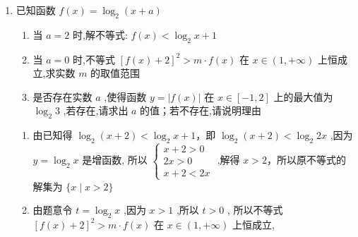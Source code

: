 \begin{enumerate}
\begin{jieda}
        又 $\forall {x}_{1} \in  \left\lbrack  {0,1}\right\rbrack  ,\exists {x}_{2} \in  \left\lbrack  {-3,5}\right\rbrack$ ,使得 $g\left( {x}_{1}\right)  = f\left( {x}_{2}\right)$ ,
        
        所以 $\left\lbrack  {{2m} + 2,m + 2}\right\rbrack   \subseteq  \left\lbrack  {1,3}\right\rbrack$ ,
        
        所以 $\left\{  \begin{array}{l} {2m} + 2 \geq  1 \\  m + 2 \leq  3 \end{array}\right.$ ,解得 $- \dfrac{1}{2} \leq  m < 0$ .
        
        综上,实数 $m$ 的取值范围是 $\left\lbrack  {-\dfrac{1}{2},0}\right)  \cup  \left( {0,\dfrac{1}{2}}\right\rbrack$ .
    \end{jieda}
    \item 已知函数 $f\left( x\right)  = {\log }_{2}\left( {x + a}\right)$
    \begin{enumerate}
        \item 当 $a = 2$ 时,解不等式: $f\left( x\right)  < {\log }_{2}x + 1$
        \item 当 $a = 0$ 时,不等式 ${\left\lbrack  f\left( x\right)  + 2\right\rbrack  }^{2} > m \cdot  f\left( x\right)$ 在 $x \in  \left( {1, + \infty }\right)$ 上恒成立,求实数 $m$ 的取值范围
        \item 是否存在实数 $a$ ,使得函数 $y = \left| {f\left( x\right) }\right|$ 在 $x \in  \left\lbrack  {-1,2}\right\rbrack$ 上的最大值为 ${\log }_{2}3$ ,若存在,请求出 $a$ 的值；若不存在,请说明理由
    \end{enumerate}
    \begin{jieda}
        \begin{enumerate}
            \item 由已知得 ${\log }_{2}\left( {x + 2}\right)  < {\log }_{2}x + 1$，即 ${\log }_{2}\left( {x + 2}\right)  < {\log }_{2}{2x}$ ,因为 $y = {\log }_{2}x$ 是增函数,
            所以 $\left\{  \begin{array}{l} x + 2 > 0 \\  {2x} > 0 \\  x + 2 < {2x} \end{array}\right.$ ,解得 $x > 2$，所以原不等式的解集为 $\{ x \mid  x > 2\}$
            \item 由题意令 $t = {\log }_{2}x$ ,因为 $x > 1$ ,所以 $t > 0$ ,
            所以不等式 ${\left\lbrack  f\left( x\right)  + 2\right\rbrack  }^{2} > m \cdot  f\left( x\right)$ 在 $x \in  \left( {1, + \infty }\right)$ 上恒成立,

\end{enumerate}
\end{jieda}
\end{enumerate}
